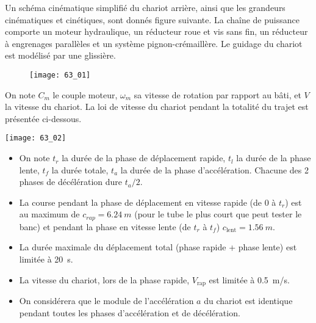 \normaltrue
\correctionfalse


\setcounter{question}{0}%
\ifcorrection
\else
{}
\fi

\ifprof
\else
Un schéma cinématique simplifié du chariot arrière, ainsi que les grandeurs cinématiques et cinétiques,
sont donnés figure suivante.
La chaîne de puissance comporte un moteur hydraulique, un réducteur roue et vis sans fin, un réducteur à
engrenages parallèles et un système pignon-crémaillère.
Le guidage du chariot est modélisé par une glissière.



\begin{figure}[H]
\centering
\texttt{[image: 63\_01]}
\end{figure}


On note $C_m$  le couple moteur, $\omega_m$ sa vitesse de rotation par rapport au bâti, et $V$ la vitesse du chariot.
La loi de vitesse du chariot pendant la totalité du trajet est présentée ci-dessous.

\begin{marginfigure}
\centering
\texttt{[image: 63\_02]}
\end{marginfigure}


\begin{itemize}
\item On note $t_r$ la durée de la phase de déplacement rapide, $t_l$ la durée de la phase lente, $t_f$ la durée
totale, $t_a$ la durée de la phase d'accélération. Chacune des 2 phases de décélération dure $t_a/2$.
\item La course pendant la phase de déplacement en vitesse rapide (de 0 à $t_r$) est au maximum de
$c_{rap}= \SI{6,24}{m}$ (pour le tube le plus court que peut tester le banc) et pendant la phase en vitesse
lente (de $t_r$ à $t_f$) $c_{\text{lent}}= \SI{1,56}{m}$.
\item La durée maximale du déplacement total (phase rapide + phase lente) est limitée à \SI{20}{s}.
\item La vitesse du chariot, lors de la phase rapide, $V_{\text{rap}}$ est limitée à \SI{0,5}{m/s}.
\item On considérera que le module de l'accélération $a$ du chariot est identique pendant toutes les
phases d'accélération et de décélération.
\end{itemize}

